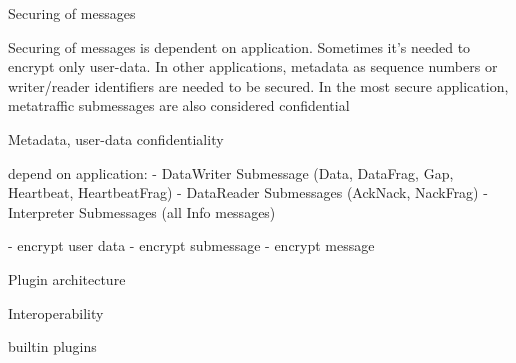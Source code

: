\sec Securing of messages

Securing of messages is dependent on application. Sometimes it's needed to encrypt only user-data. In other applications, metadata as sequence numbers or writer/reader identifiers are needed to be secured. In the most secure application, metatraffic submessages are also considered confidential

Metadata, user-data confidentiality

depend on application:
- DataWriter Submessage (Data, DataFrag, Gap, Heartbeat, HeartbeatFrag)
- DataReader Submessages (AckNack, NackFrag)
- Interpreter Submessages (all Info messages)

- encrypt user data
- encrypt submessage
- encrypt message

\sec Plugin architecture



\sec Interoperability

builtin plugins

